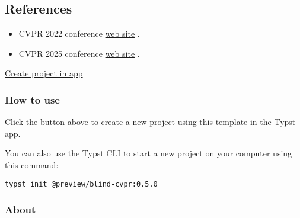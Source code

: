 \subsection{References}\label{references}

\begin{itemize}
\tightlist
\item
  CVPR 2022 conference
  \href{https://cvpr2022.thecvf.com/author-guidelines\#dates}{web site}
  .
\item
  CVPR 2025 conference
  \href{https://cvpr.thecvf.com/Conferences/2025}{web site} .
\end{itemize}

\href{/app?template=blind-cvpr&version=0.5.0}{Create project in app}

\subsubsection{How to use}\label{how-to-use}

Click the button above to create a new project using this template in
the Typst app.

You can also use the Typst CLI to start a new project on your computer
using this command:

\begin{verbatim}
typst init @preview/blind-cvpr:0.5.0
\end{verbatim}



\subsubsection{About}\label{about}

